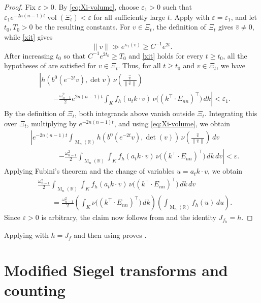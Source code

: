 \documentclass[reqno,11pt]{amsart}
\numberwithin{equation}{section}
\theoremstyle{definition}
\theoremstyle{remark}
\newcommand{\op}{\operatorname}
\newcommand{\R}{\mathbb R}
\newcommand{\e}{\varepsilon}
\newcommand{\M}{\op{M}}
\begin{document}
\begin{proof}
Fix $\e>0$. By \eqref{eq:Xi-volume}, choose $\e_1>0$ such that
$\e_1e^{-2n(n-1)t}\operatorname{vol}(\Xi_t)<\e$ for all sufficiently large $t$.
Apply  with $\varepsilon=\varepsilon_1$, and let
$t_0,T_0>0$ be the resulting constants. For $v\in\Xi_t$, the
definition of $\Xi_t$ gives $\widehat v\ne0$, while \eqref{xit} gives
$$
\|v\|\gg e^{\kappa_1(v)}\ge C^{-1}e^{2t}.
$$
After increasing $t_0$ so that $C^{-1}e^{2t_0}\ge T_0$ and \eqref{xit} holds for every $t\ge t_0$, all the hypotheses
of  are satisfied for $v\in\Xi_t$. Thus, for all $t\ge t_0$ and
$v\in \Xi_t$, we have
\begin{equation*}
\begin{aligned}
&\left|h(b^0(e^{-2t}v),\det v)\,
\nu\!\left(\frac{\widehat v}{\|\widehat v\|}\right)\right.\\
&\qquad\left.-
\frac{\omega_{n-1}^2}{2}e^{2n(n-1)t}
\int_K f_h(a_tk\cdot v)\,
\nu\bigl((k^{\intercal}\!\cdot E_{nn})^{\intercal}\bigr)\,dk
\right|<\e_1.
\end{aligned}
\end{equation*}
By the definition of $\Xi_t$, both integrands above vanish outside $\Xi_t$.  Integrating this over $\Xi_t$, multiplying by $e^{-2n(n-1)t}$, and using
\eqref{eq:Xi-volume}, we obtain
$$
\begin{aligned}
&
\left|
e^{-2n(n-1)t}
\int_{\M_n(\R)}
h(b^0(e^{-2t}v),\det(v))\,
\nu\!\left(\frac{\widehat v}{\|\widehat v\|}\right)\,dv \right. \\
&\qquad\qquad\left.
-
\frac{\omega_{n-1}^2}{2}
\int_{\M_n(\R)}\int_K
f_h(a_tk\cdot v)\,
\nu\bigl((k^{\intercal}\!\cdot E_{nn})^{\intercal}\bigr)\,dk\,dv
\right|
<\e.
\end{aligned}
$$
Applying Fubini's theorem and the change of variables $u=a_tk\cdot v$, we obtain
$$
\begin{aligned}
&\frac{\omega_{n-1}^2}{2}
\int_{\M_n(\R)}\int_K
f_h(a_tk\cdot v)\,
\nu\bigl((k^{\intercal}\!\cdot E_{nn})^{\intercal}\bigr)\,dk\,dv \\
&\qquad=
\frac{\omega_{n-1}^2}{2}
\left(\int_K \nu\bigl((k^{\intercal}\!\cdot E_{nn})^{\intercal}\bigr)\,dk\right)
\left(\int_{\M_n(\R)} f_h(u)\,du\right).
\end{aligned}
$$
 Since $\e>0$ is arbitrary, the claim now follows
 from   and the identity $J_{f_h}=h$.
\end{proof}


Applying  with $h=J_f$ and then using
 proves .
\section{Modified Siegel transforms and counting}
\label{s:maincounting}
\end{document}
